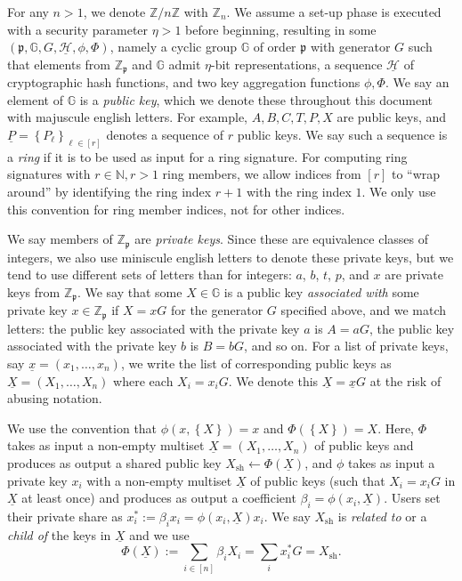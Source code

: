 \documentclass{mrl}
\theoremstyle{definition}
\numberwithin{theorem}{subsection}
\newcommand{\scalarField}{\mathbb{Z}_{\mathfrak{p}}}
\newcommand{\bbz}{\mathbb{Z}}
\newcommand{\bbn}{\mathbb{N}}
\newcommand{\group}{\mathbb{G}}
\newcommand{\p}{\mathfrak{p}}
\begin{document}
For any $n > 1$, we denote $\bbz/n\bbz$ with $\bbz_n$. We assume a set-up phase is executed with a security parameter $\eta > 1$ before beginning, resulting in some $(\p, \group, G, \underline{\mathcal{H}}, \phi, \Phi)$, namely a cyclic group $\group$ of order $\p$ with generator $G$ such that elements from $\bbz_\p$ and $\mathbb{G}$ admit $\eta$-bit representations, a sequence $\underline{\mathcal{H}}$ of cryptographic hash functions, and two key aggregation functions $\phi, \Phi$. We say an element of $\group$ is a \textit{public key}, which we denote these throughout this document with majuscule english letters. For example, $A, B, C, T, P, X$ are public keys, and $\underline{P} = \left\{P_\ell \right\}_{\ell \in [r]}$ denotes a sequence of $r$ public keys.  We say such a sequence is a \textit{ring} if it is to be used as input for a ring signature. For computing ring signatures with $r \in \bbn, r > 1$ ring members, we allow indices from $[r]$ to ``wrap around'' by identifying the ring index $r+1$ with the ring index $1$. We only use this convention for ring member indices, not for other indices. 

We say members of $\scalarField$ are \textit{private keys}. Since these are equivalence classes of integers, we also use miniscule english letters to denote these private keys, but we tend to use different sets of letters than for integers: $a$, $b$, $t$, $p$, and $x$ are private keys from $\scalarField$. We say that some $X \in \group$ is a public key \textit{associated with} some private key $x \in \scalarField$ if $X = xG$ for the generator $G$ specified above, and we match letters: the public key associated with the private key $a$ is $A = aG$, the public key associated with the private key $b$ is $B = bG$, and so on. For a list of private keys, say $\underline{x} =  (x_1, \ldots, x_n)$, we write the list of corresponding public keys as $\underline{X} = (X_1, \ldots, X_n)$ where each $X_i = x_i G$. We denote this $\underline{X} = \underline{x}G$ at the risk of abusing notation. 

We use the convention that $\phi(x, \left\{X\right\}) = x$ and $\Phi(\left\{X\right\}) = X$. Here, $\Phi$ takes as input a non-empty multiset $\underline{X} = (X_1, \ldots, X_n)$ of public keys and produces as output a shared public key $X_{\text{sh}} \leftarrow \Phi(\underline{X})$, and $\phi$ takes as input a private key $x_i$ with a non-empty multiset $\underline{X}$ of public keys (such that $X_i = x_iG$ in $\underline{X}$ at least once) and produces as output a coefficient $\beta_i = \phi(x_i, \underline{X})$. Users set their private share as $x_i^* := \beta_i x_i = \phi(x_i, \underline{X}) x_i$. We say $X_{\text{sh}}$ is \textit{related to} or a \textit{child of} the keys in $\underline{X}$ and we use \[\Phi(\underline{X}) := \sum_{i \in [n]} \beta_i X_i = \sum_i x_i^* G = X_{\text{sh}}.\]
\end{document}
